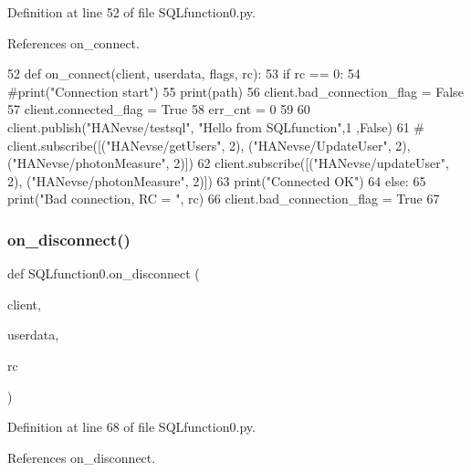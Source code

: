 Definition at line 52 of file S\+Q\+Lfunction0.\+py.



References on\+\_\+connect.


\begin{DoxyCode}
52 \textcolor{keyword}{def }on_connect(client, userdata, flags, rc):
53     \textcolor{keywordflow}{if} rc == 0:
54         \textcolor{comment}{#print("Connection start")}
55         print(path)
56         client.bad\_connection\_flag = \textcolor{keyword}{False}
57         client.connected\_flag = \textcolor{keyword}{True}        
58         err\_cnt = 0
59 
60         client.publish(\textcolor{stringliteral}{"HANevse/testsql"}, \textcolor{stringliteral}{"Hello from SQLfunction"},1 ,\textcolor{keyword}{False})
61 \textcolor{comment}{#        client.subscribe([("HANevse/getUsers", 2), ("HANevse/UpdateUser", 2), ("HANevse/photonMeasure",
       2)])}
62         client.subscribe([(\textcolor{stringliteral}{"HANevse/updateUser"}, 2), (\textcolor{stringliteral}{"HANevse/photonMeasure"}, 2)])
63         print(\textcolor{stringliteral}{"Connected OK"})
64     \textcolor{keywordflow}{else}:
65         print(\textcolor{stringliteral}{"Bad connection, RC = "}, rc)
66         client.bad\_connection\_flag = \textcolor{keyword}{True}
67         
\end{DoxyCode}
\mbox{\label{namespace_s_q_lfunction0_a67dfbec5d5db9aa54fe47d462a5b356e}} 
\subsubsection{on\+\_\+disconnect()}
{\footnotesize\ttfamily def S\+Q\+Lfunction0.\+on\+\_\+disconnect (\begin{DoxyParamCaption}\item[{}]{client,  }\item[{}]{userdata,  }\item[{}]{rc }\end{DoxyParamCaption})}



Definition at line 68 of file S\+Q\+Lfunction0.\+py.



References on\+\_\+disconnect.


